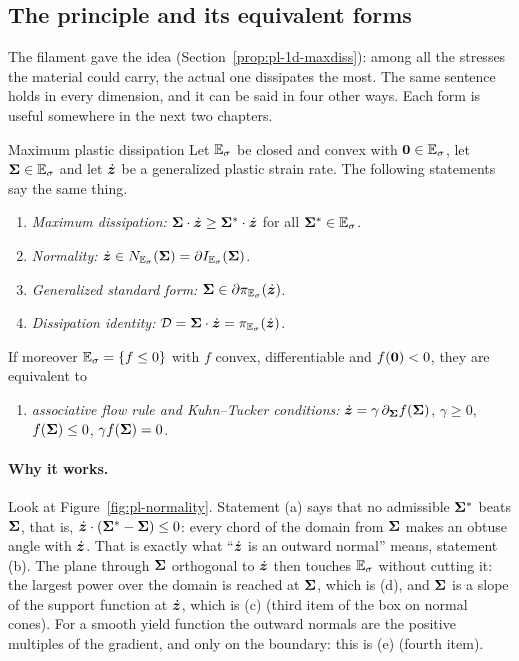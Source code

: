 \subsection{The principle and its equivalent forms}\label{ssec:pl-maxdiss-thm}
The filament gave the idea (Section~\ref{prop:pl-1d-maxdiss}): among all the
stresses the material could carry, the actual one dissipates the most. The
same sentence holds in every dimension, and it can be said in four other
ways. Each form is useful somewhere in the next two chapters.
\begin{gbox}{Maximum plastic dissipation}\label{thm:pl-maxdiss}
Let $\mathbb{E}_{\sigma}$ be closed and convex with $\bm{0}\in\mathbb{E}_{\sigma}$, let $\bm{\Sigma}\in\mathbb{E}_{\sigma}$ and
let $\dot{\bm{z}}$ be a generalized plastic strain rate. The following statements
say the same thing.
\begin{enumerate}[label=(\alph*)]
  \item \emph{Maximum dissipation:} $\bm{\Sigma}\cdot\dot{\bm{z}}\ge\bm{\Sigma}^\ast\cdot\dot{\bm{z}}$
  for all $\bm{\Sigma}^\ast\in\mathbb{E}_{\sigma}$.
  \item \emph{Normality:} $\dot{\bm{z}}\in N_{\mathbb{E}_{\sigma}}(\bm{\Sigma})=\partial I_{\mathbb{E}_{\sigma}}(\bm{\Sigma})$.
  \item \emph{Generalized standard form:} $\bm{\Sigma}\in\partial\pi_{\mathbb{E}_{\sigma}}(\dot{\bm{z}})$.
  \item \emph{Dissipation identity:} $\mathcal D=\bm{\Sigma}\cdot\dot{\bm{z}}=\pi_{\mathbb{E}_{\sigma}}(\dot{\bm{z}})$.
\end{enumerate}
If moreover $\mathbb{E}_{\sigma}=\{f\le0\}$ with $f$ convex, differentiable and
$f(\bm{0})<0$, they are equivalent to
\begin{enumerate}[label=(\alph*),start=5]
  \item \emph{associative flow rule and Kuhn--Tucker conditions:}
  $\dot{\bm{z}}=\gamma\,\partial_{\bm{\Sigma}}f(\bm{\Sigma})$, $\gamma\ge0$, $f(\bm{\Sigma})\le0$,
  $\gamma f(\bm{\Sigma})=0$.
\end{enumerate}
\end{gbox}
\paragraph{Why it works.} Look at Figure~\ref{fig:pl-normality}. Statement
(a) says that no admissible $\bm{\Sigma}^\ast$ beats $\bm{\Sigma}$, that is,
$\dot{\bm{z}}\cdot(\bm{\Sigma}^\ast-\bm{\Sigma})\le0$: every chord of the domain from $\bm{\Sigma}$
makes an obtuse angle with $\dot{\bm{z}}$. That is exactly what ``$\dot{\bm{z}}$ is an
outward normal'' means, statement (b). The plane through $\bm{\Sigma}$ orthogonal to
$\dot{\bm{z}}$ then touches $\mathbb{E}_{\sigma}$ without cutting it: the largest power over the
domain is reached at $\bm{\Sigma}$, which is (d), and $\bm{\Sigma}$ is a slope of the
support function at $\dot{\bm{z}}$, which is (c) (third item of the box on normal
cones). For a smooth yield function the outward normals are the positive
multiples of the gradient, and only on the boundary: this is (e) (fourth
item).

